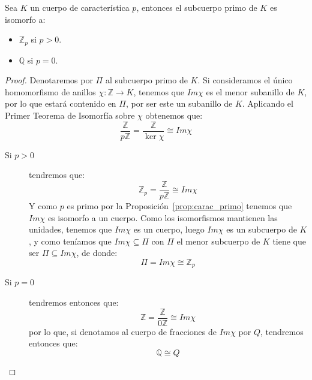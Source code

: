 \begin{prop}\label{prop:subcuerpo_primo}
    Sea $K$ un cuerpo de característica $p$, entonces el subcuerpo primo de $K$ es isomorfo a:
    \begin{itemize}
        \item $\mathbb{Z}_p$ si $p>0$.
        \item $\mathbb{Q}$ si $p = 0$.
    \end{itemize}
    \begin{proof}
        Denotaremos por $\Pi$ al subcuerpo primo de $K$.
        Si consideramos el único homomorfismo de anillos $\chi:\mathbb{Z}\to K$, tenemos que $Im\chi$ es el menor subanillo de $K$, por lo que estará contenido en $\Pi$, por ser este un subanillo de $K$. Aplicando el Primer Teorema de Isomorfía sobre $\chi$ obtenemos que:
        \begin{equation*}
            \dfrac{\mathbb{Z}}{p\mathbb{Z}} = \dfrac{\mathbb{Z}}{\ker\chi} \cong Im\chi 
        \end{equation*}
        \begin{description}
            \item [Si $p>0$] tendremos que:
                \begin{equation*}
                    \mathbb{Z}_p = \dfrac{\mathbb{Z}}{p\mathbb{Z}} \cong Im\chi
                \end{equation*}
                Y como $p$ es primo por la Proposición~\ref{prop:carac_primo} tenemos que $Im\chi$ es isomorfo a un cuerpo. Como los isomorfismos mantienen las unidades, tenemos que $Im\chi$ es un cuerpo, luego $Im\chi $ es un subcuerpo de $K$, y como teníamos que $Im\chi\subseteq \Pi$ con $\Pi$ el menor subcuerpo de $K$ tiene que ser $\Pi\subseteq Im\chi$, de donde:
                \begin{equation*}
                    \Pi = Im\chi \cong \mathbb{Z}_p
                \end{equation*}
            \item [Si $p=0$] tendremos entonces que:
                \begin{equation*}
                    \mathbb{Z} = \frac{\mathbb{Z}}{0\mathbb{Z}} \cong Im\chi
                \end{equation*}
                por lo que, si denotamos al cuerpo de fracciones de $Im\chi$ por $Q$, tendremos entonces que:
                \begin{equation*}
                    \mathbb{Q}\cong Q
                \end{equation*}

\end{description}
\end{proof}
\end{prop}
